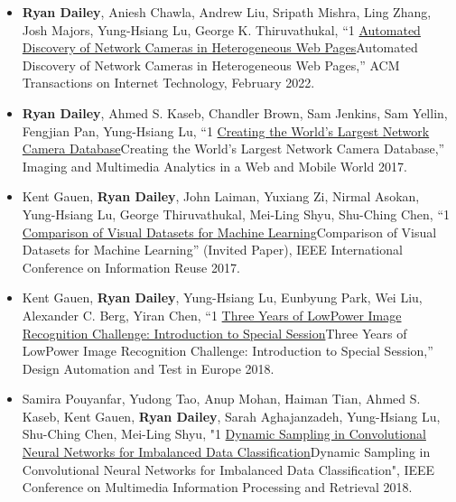 \documentclass[10pt]{article}
\newlength{\cvcolumngapwidth}
\newlength{\cvleftcolumnwidth}
\newlength{\cvrightcolumnwidth}
\newcommand{\cvdurationstyle}[1]{{\small\cvdurationfont\textcolor{cvdurationcolor}{#1}}}
\newlength{\cvafteritemskipamount}
\newlength{\cvparskip}
\newcommand{\cvitem}[2]{
    \begin{minipage}[t]{\cvleftcolumnwidth}
        \raggedleft #1
    \end{minipage}%
    \hspace{\cvcolumngapwidth}%
    \begin{minipage}[t]{\cvrightcolumnwidth}
        \setlength{\parskip}{\cvparskip} #2
    \end{minipage}

    \vspace{\cvafteritemskipamount}
}
\def\online{1}
\def\cv{0}
\begin{document}
\cvitem{
    \cvdurationstyle{}
}{
    \begin{itemize}[leftmargin=*]
    
        \item \textbf{Ryan Dailey}, Aniesh Chawla, Andrew Liu, Sripath Mishra, Ling Zhang, Josh Majors, Yung-Hsiang Lu, George K. Thiruvathukal, “\if\online1 \href{https://dl.acm.org/doi/10.1145/3450629}{Automated Discovery of Network Cameras in Heterogeneous Web Pages}\else Automated Discovery of Network Cameras in Heterogeneous Web Pages\fi,” ACM Transactions on Internet Technology, February 2022.

        \item \textbf{Ryan Dailey}, Ahmed S. Kaseb, Chandler Brown, Sam Jenkins, Sam Yellin, Fengjian Pan, Yung-Hsiang Lu, “\if\online1 \href{https://drive.google.com/open?id=1479pCURB0qsDXMOfdWBarYYTbIyrDcYf}{Creating the World’s Largest Network Camera Database}\else Creating the World’s Largest Network Camera Database\fi,” Imaging and Multimedia Analytics in a Web and Mobile World 2017.
        
        \item Kent Gauen, \textbf{Ryan Dailey}, John Laiman, Yuxiang Zi, Nirmal Asokan, Yung-Hsiang Lu, George Thiruvathukal, Mei-Ling Shyu, Shu-Ching Chen, “\if\online1 \href{https://drive.google.com/open?id=1YFEIxjftRhNtgMDuUe9-cY8GJ_6H00yZ}{Comparison of Visual Datasets for Machine Learning}\else Comparison of Visual Datasets for Machine Learning\fi” (Invited Paper), IEEE International Conference on Information Reuse 2017.
        
        \item Kent Gauen, \textbf{Ryan Dailey}, Yung-Hsiang Lu, Eunbyung Park, Wei Liu, Alexander C. Berg, Yiran Chen, “\if\online1 \href{https://drive.google.com/open?id=1ZV4mC7vhHB9v9lOCJ_r946EbLbhj4Nus}{Three Years of LowPower Image Recognition Challenge: Introduction to Special Session}\else Three Years of LowPower Image Recognition Challenge: Introduction to Special Session\fi,” Design Automation and Test in Europe 2018.
       
        \item Samira Pouyanfar, Yudong Tao, Anup Mohan, Haiman Tian, Ahmed S. Kaseb, Kent Gauen, \textbf{Ryan Dailey}, Sarah Aghajanzadeh, Yung-Hsiang Lu, Shu-Ching Chen, Mei-Ling Shyu, "\if\online1 \href{https://drive.google.com/open?id=1MIHxzYJoPLmKy7OXyZUhjhRnKTiDwypx}{Dynamic Sampling in Convolutional Neural Networks for Imbalanced Data Classification}\else Dynamic Sampling in Convolutional Neural Networks for Imbalanced Data Classification\fi", IEEE Conference on Multimedia Information Processing and Retrieval 2018.
        

\end{itemize}}
\end{document}
